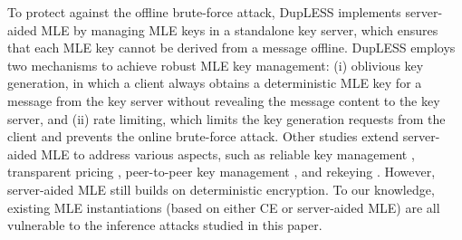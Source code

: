	

To protect against the offline brute-force attack, DupLESS \cite{bellare13b}
implements server-aided MLE by managing MLE keys in a standalone key server,
which ensures that each MLE key cannot be derived from a message offline.
DupLESS employs two mechanisms to achieve robust MLE key management: (i)
oblivious key generation, in which a client always obtains a deterministic MLE
key for a message from the key server without revealing the message content to
the key server, and (ii) rate limiting, which limits the key generation
requests from the client and prevents the online brute-force attack.  Other
studies extend server-aided MLE to address various aspects, such as reliable
key management \cite{duan14}, transparent pricing \cite{armknecht15},
peer-to-peer key management \cite{liu15}, and rekeying \cite{qin17}.  However,
server-aided MLE still builds on deterministic encryption.  To our
knowledge, existing MLE instantiations (based on either CE or server-aided
MLE) are all vulnerable to the inference attacks studied in this paper.  



